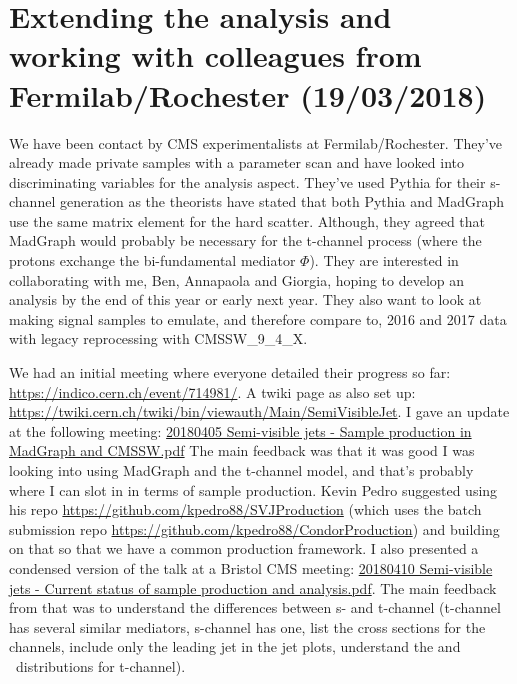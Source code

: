 

\section{Extending the analysis and working with colleagues from Fermilab/Rochester (19/03/2018)}

We have been contact by CMS experimentalists at Fermilab/Rochester. They've already made private samples with a parameter scan and have looked into discriminating variables for the analysis aspect. They've used Pythia for their s-channel generation as the theorists have stated that both Pythia and MadGraph use the same matrix element for the hard scatter. Although, they agreed that MadGraph would probably be necessary for the t-channel process (where the protons exchange the bi-fundamental mediator $\Phi$). They are interested in collaborating with me, Ben, Annapaola and Giorgia, hoping to develop an analysis by the end of this year or early next year. They also want to look at making signal samples to emulate, and therefore compare to, 2016 and 2017 data with legacy reprocessing with CMSSW\_9\_4\_X.

We had an initial meeting where everyone detailed their progress so far: \url{https://indico.cern.ch/event/714981/}. A twiki page as also set up: \url{https://twiki.cern.ch/twiki/bin/viewauth/Main/SemiVisibleJet}. I gave an update at the following meeting: \href{run:./sec35/20180405 Semi-visible jets - Sample production in MadGraph and CMSSW.pdf}{20180405 Semi-visible jets - Sample production in MadGraph and CMSSW.pdf} The main feedback was that it was good I was looking into using MadGraph and the t-channel model, and that's probably where I can slot in in terms of sample production. Kevin Pedro suggested using his repo \url{https://github.com/kpedro88/SVJProduction} (which uses the batch submission repo \url{https://github.com/kpedro88/CondorProduction}) and building on that so that we have a common production framework. I also presented a condensed version of the talk at a Bristol CMS meeting: \href{run:./sec35/20180410 Semi-visible jets - Current status of sample production and analysis.pdf}{20180410 Semi-visible jets - Current status of sample production and analysis.pdf}. The main feedback from that was to understand the differences between s- and t-channel (t-channel has several similar mediators, s-channel has one, list the cross sections for the channels, include only the leading jet \pt in the jet \pt plots, understand the \njet and \etmiss\ distributions for t-channel).

